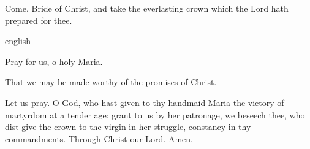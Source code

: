\begin{enpars}Come, Bride of Christ, and take the everlasting crown which the Lord hath prepared for thee.\end{enpars}

{english}{\noindent \vv Pray for us, o holy Maria.

\noindent \rr That we may be made worthy of the promises of Christ.

\noindent Let us pray. O God, who hast given to thy handmaid
Maria the victory of martyrdom at a tender age: grant to us by her patronage,
we beseech thee, who dist give the crown to
the virgin in her struggle, constancy in thy commandments. Through Christ our Lord. Amen.}